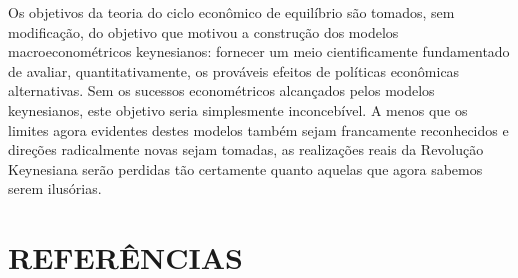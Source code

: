 \documentclass[12pt]{article}
\begin{document}
Os objetivos da teoria do ciclo econômico de equilíbrio são tomados, sem modificação, do objetivo que motivou a construção dos modelos macroeconométricos keynesianos: fornecer um meio cientificamente fundamentado de avaliar, quantitativamente, os prováveis efeitos de políticas econômicas alternativas. Sem os sucessos econométricos alcançados pelos modelos keynesianos, este objetivo seria simplesmente inconcebível. A menos que os limites agora evidentes destes modelos também sejam francamente reconhecidos e direções radicalmente novas sejam tomadas, as realizações reais da Revolução Keynesiana serão perdidas tão certamente quanto aquelas que agora sabemos serem ilusórias.

\section*{REFERÊNCIAS}
\end{document}
